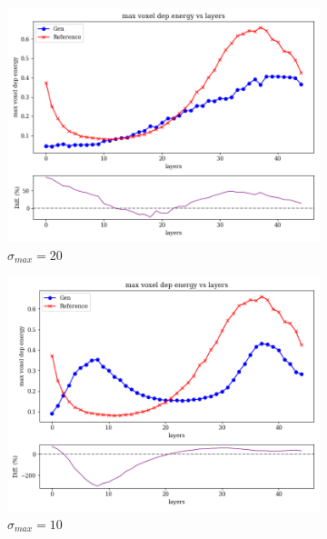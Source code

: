 \begin{figure}
    \centering
    \begin{subfigure}[b]{0.23\textwidth}
        \centering
        \includegraphics[width=\textwidth]{Figures/vp20_5.png}
        \caption{$\sigma_{max}=20$}
        \label{fig:vp20_5}
    \end{subfigure}
    \hfill
    \begin{subfigure}[b]{0.23\textwidth}
        \centering
        \includegraphics[width=\textwidth]{Figures/vp10_5.png}
        \caption{$\sigma_{max}=10$}
        \label{fig:vp10_5}
    \end{subfigure}
    \hfill
    \begin{subfigure}[b]{0.23\textwidth}

\end{subfigure}
\end{figure}
